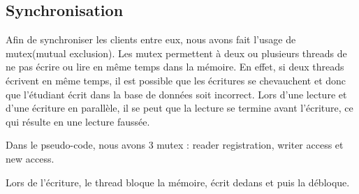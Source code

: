 \documentclass[utf8]{article}
\begin{document}
\begin{large}
\section{Synchronisation}
\par
\indent

Afin de synchroniser les clients entre eux, nous avons fait l'usage de
mutex(mutual exclusion). Les mutex permettent à deux ou plusieurs threads de ne
pas écrire ou lire en même temps dans la mémoire. En effet, si deux threads
écrivent en même temps, il est possible que les écritures se chevauchent et donc
que l'étudiant écrit dans la base de données soit incorrect. Lors d'une lecture
et d'une écriture en parallèle, il se peut que la lecture se termine avant
l'écriture, ce qui résulte en une lecture faussée.
\par
Dans le pseudo-code, nous avons 3 mutex : reader registration, writer access et
new access. 
\par

Lors de l'écriture, le thread bloque la mémoire, écrit dedans et puis la débloque.


\end{large}
\end{document}
